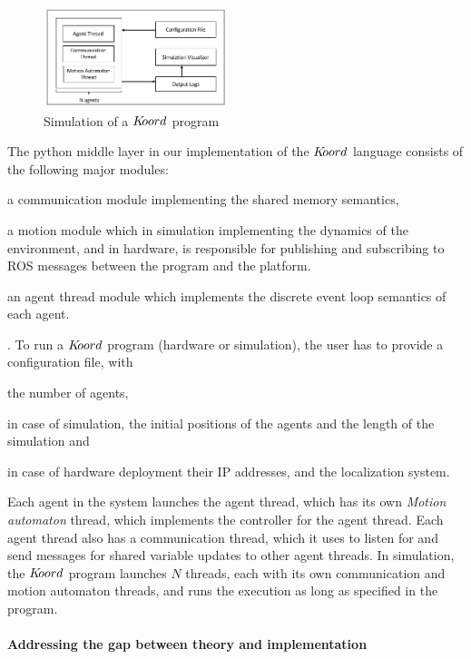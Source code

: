 \begin{figure}[h!]
\centering
\includegraphics[width=0.48\textwidth]{figs/simulationengine.png}
\caption{Simulation of a $K\kern-2pt oord$ program }
\label{fig:simfig}
\end{figure}
The python middle layer in our implementation of the $K\kern-2pt oord$ language consists of the following major modules:\begin{inparaenum}
\item a communication module implementing the shared memory semantics,\item a motion module which in simulation implementing the dynamics of the environment, and in hardware, is responsible for publishing and subscribing to ROS messages between the program and the platform. \item an agent thread module which implements the discrete event loop semantics of each agent. 
\end{inparaenum}. To run a $K\kern-2pt oord$ program (hardware or simulation), the user has to provide a configuration file, with \begin{inparaenum}\item the number of agents, \item in case of simulation, the initial positions of the agents and the length of the simulation and \item in case of hardware deployment their IP addresses, and the localization system.\end{inparaenum} Each agent in the system launches the agent thread, which has its own \emph{Motion automaton} thread, which implements the controller for the agent thread. Each agent thread also has a communication thread, which it uses to listen for and send messages for shared variable updates to other agent threads. In simulation, the $K\kern-2pt oord$ program launches $N$ threads, each with its own communication and motion automaton threads, and runs the execution as long as specified in the program.


\paragraph{Addressing the gap between theory and implementation}

